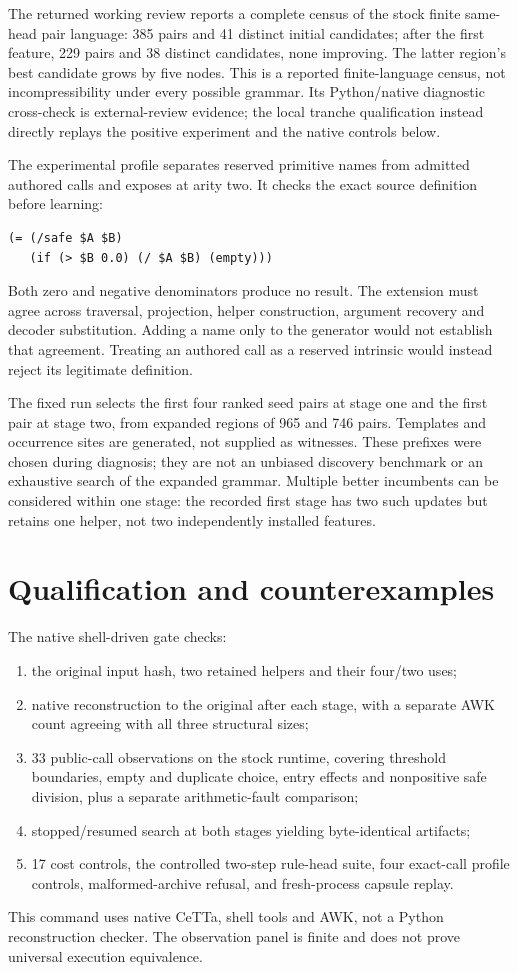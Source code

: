 \documentclass[11pt,a4paper]{article}
\newcommand{\code}[1]{\texttt{\detokenize{#1}}}
\begin{document}
The returned working review reports a complete census of the stock finite
same-head pair language: 385 pairs and 41 distinct initial candidates; after
the first feature, 229 pairs and 38 distinct candidates, none improving.
The latter region's best candidate grows by five nodes. This is a reported
finite-language census, not incompressibility under every possible grammar.
Its Python/native diagnostic cross-check is external-review evidence; the
local tranche qualification instead directly replays the positive experiment
and the native controls below.

The experimental profile separates reserved primitive names from admitted
authored calls and exposes \code{/safe} at arity two. It checks the exact
source definition before learning:
\begin{lstlisting}
(= (/safe $A $B)
   (if (> $B 0.0) (/ $A $B) (empty)))
\end{lstlisting}
Both zero and negative denominators produce no result. The extension must
agree across traversal, projection, helper construction, argument recovery
and decoder substitution. Adding a name only to the generator would not
establish that agreement. Treating an authored call as a reserved intrinsic
would instead reject its legitimate definition.

The fixed run selects the first four ranked seed pairs at stage one and the
first pair at stage two, from expanded regions of 965 and 746 pairs. Templates
and occurrence sites are generated, not supplied as witnesses. These prefixes
were chosen during diagnosis; they are not an unbiased discovery benchmark
or an exhaustive search of the expanded grammar. Multiple better incumbents
can be considered within one stage: the recorded first stage has two such
updates but retains one helper, not two independently installed features.

\section{Qualification and counterexamples}

The native shell-driven gate checks:
\begin{enumerate}
\item the original input hash, two retained helpers and their four/two uses;
\item native reconstruction to the original after each stage, with a separate
AWK count agreeing with all three structural sizes;
\item 33 public-call observations on the stock runtime, covering threshold
boundaries, empty and duplicate choice, entry effects and nonpositive safe
division, plus a separate arithmetic-fault comparison;
\item stopped/resumed search at both stages yielding byte-identical artifacts;
\item 17 cost controls, the controlled two-step rule-head suite, four exact-call
profile controls, malformed-archive refusal, and fresh-process capsule replay.
\end{enumerate}
This command uses native CeTTa, shell tools and AWK, not a Python reconstruction
checker. The observation panel is finite and does not prove universal execution
equivalence.
\end{document}
